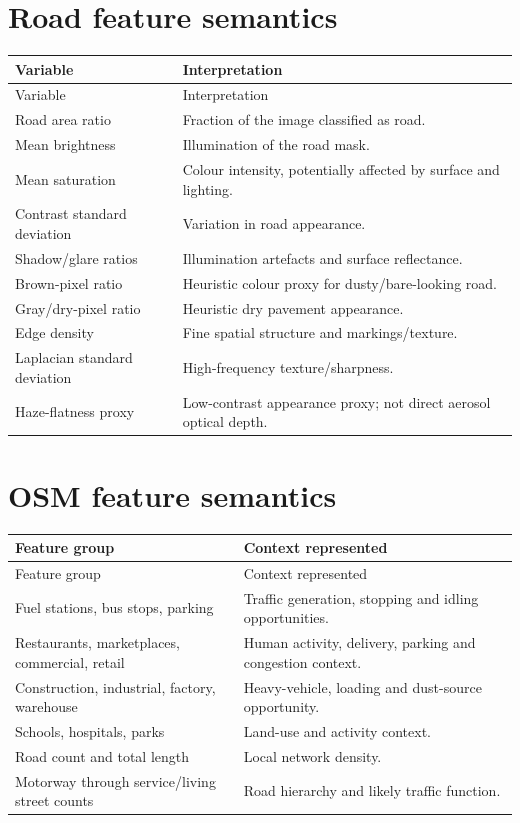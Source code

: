 \documentclass[11pt,a4paper,oneside]{report}
\begin{document}
\section{Road feature semantics}
\begin{longtable}{p{}p{}}
  \toprule
  Variable & Interpretation\\
  \midrule
  \endfirsthead
  \toprule
  Variable & Interpretation\\
  \midrule
  \endhead
  Road area ratio & Fraction of the image classified as road.\\
  Mean brightness & Illumination of the road mask.\\
  Mean saturation & Colour intensity, potentially affected by surface and
  lighting.\\
  Contrast standard deviation & Variation in road appearance.\\
  Shadow/glare ratios & Illumination artefacts and surface reflectance.\\
  Brown-pixel ratio & Heuristic colour proxy for dusty/bare-looking road.\\
  Gray/dry-pixel ratio & Heuristic dry pavement appearance.\\
  Edge density & Fine spatial structure and markings/texture.\\
  Laplacian standard deviation & High-frequency texture/sharpness.\\
  Haze-flatness proxy & Low-contrast appearance proxy; not direct aerosol optical
  depth.\\
  \bottomrule
\end{longtable}

\section{OSM feature semantics}
\begin{longtable}{p{}p{}}
  \toprule
  Feature group & Context represented\\
  \midrule
  \endfirsthead
  \toprule
  Feature group & Context represented\\
  \midrule
  \endhead
  Fuel stations, bus stops, parking & Traffic generation, stopping and idling
  opportunities.\\
  Restaurants, marketplaces, commercial, retail & Human activity, delivery,
  parking and congestion context.\\
  Construction, industrial, factory, warehouse & Heavy-vehicle, loading and
  dust-source opportunity.\\
  Schools, hospitals, parks & Land-use and activity context.\\
  Road count and total length & Local network density.\\
  Motorway through service/living street counts & Road hierarchy and likely
  traffic function.\\
  \bottomrule
\end{longtable}
\end{document}
